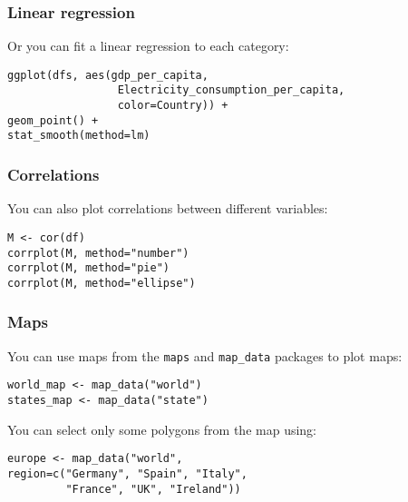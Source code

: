 \documentclass{beamer}
\begin{document}
	\begin{frame}[fragile]
		\frametitle{Linear regression}

		Or you can fit a linear regression to each category:

		\vspace{2em}
	
		\begin{exampleblock}{}
		\begin{BVerbatim}
ggplot(dfs, aes(gdp_per_capita,
                 Electricity_consumption_per_capita,
                 color=Country)) +
geom_point() +
stat_smooth(method=lm)
		\end{BVerbatim}
		\end{exampleblock}{}

	\end{frame}

	\begin{frame}[fragile]
		\frametitle{Correlations}

		You can also plot correlations between different variables:

		\vspace{2em}
	
		\begin{exampleblock}{}
		\begin{BVerbatim}
M <- cor(df)
corrplot(M, method="number")
corrplot(M, method="pie")
corrplot(M, method="ellipse")
		\end{BVerbatim}
		\end{exampleblock}{}

	\end{frame}

	\begin{frame}[fragile]
		\frametitle{Maps}

		You can use maps from the \verb|maps| and \verb|map_data| packages to plot maps:

		\vspace{1em}
	
		\begin{exampleblock}{}
		\begin{BVerbatim}
world_map <- map_data("world")
states_map <- map_data("state")
		\end{BVerbatim}
		\end{exampleblock}{}

		\vspace{1em}

		You can select only some polygons from the map using:

		\vspace{1em}

		\begin{exampleblock}{}
		\begin{BVerbatim}
europe <- map_data("world",
region=c("Germany", "Spain", "Italy",
         "France", "UK", "Ireland")) 
		\end{BVerbatim}
		\end{exampleblock}{}

	\end{frame}
\end{document}
